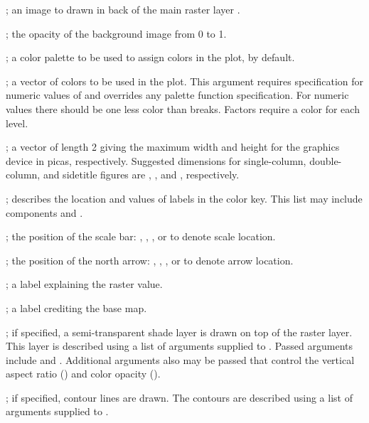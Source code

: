 \documentclass[a4paper]{book}
\begin{document}
\begin{Arguments}
\begin{ldescription}
\item[\code{bg.image}] ; an image to drawn in back of the main raster layer .
\item[\code{bg.image.alpha}] ; the opacity of the background image from 0 to 1.
\item[\code{pal}] ; a color palette to be used to assign colors in the plot,  by default.
\item[\code{col}] ; a vector of colors to be used in the plot.
This argument requires  specification for numeric values of  and overrides any palette function specification.
For numeric values there should be one less color than breaks. Factors require a color for each level.
\item[\code{max.dev.dim}] ; a vector of length 2 giving the maximum width and height for the graphics device in picas, respectively.
Suggested dimensions for single-column, double-column, and sidetitle figures are , , and , respectively.
\item[\code{labels}] ; describes the location and values of labels in the color key.
This list may include components  and .
\item[\code{scale.loc}] ; the position of the scale bar: , , , or  to denote scale location.
\item[\code{arrow.loc}] ; the position of the north arrow: , , , or  to denote arrow location.
\item[\code{explanation}] ; a label explaining the raster value.
\item[\code{credit}] ; a label crediting the base map.
\item[\code{shade}] ; if specified, a semi-transparent shade layer is drawn on top of the raster layer.
This layer is described using a list of arguments supplied to .
Passed arguments include  and .
Additional arguments also may be passed that control the vertical aspect ratio () and color opacity ().
\item[\code{contour.lines}] ; if specified, contour lines are drawn.
The contours are described using a list of arguments supplied to .

\end{ldescription}
\end{Arguments}
\end{document}
